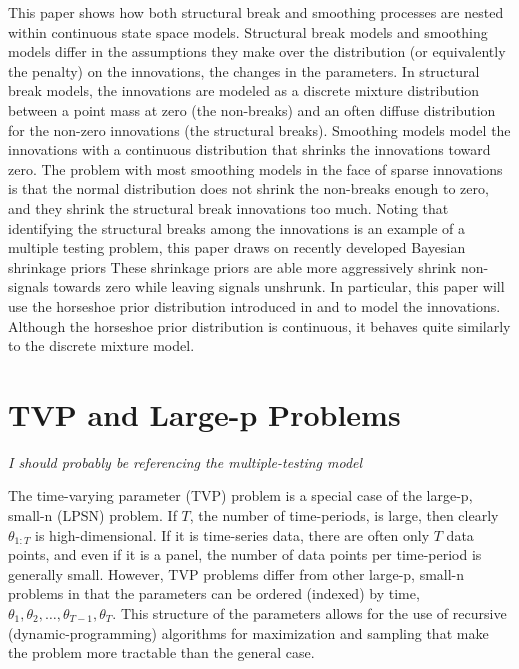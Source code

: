 \documentclass{article}
\begin{document}
This paper shows how both structural break and smoothing processes are nested within continuous state space models.
Structural break models and smoothing models differ in the assumptions they make over the distribution (or equivalently the penalty) on the innovations, the changes in the parameters.
In structural break models, the innovations are modeled as a discrete mixture distribution between a point mass at zero (the non-breaks) and an often diffuse distribution for the non-zero innovations (the structural breaks).
Smoothing models model the innovations with a continuous distribution that shrinks the innovations toward zero.
The problem with most smoothing models in the face of sparse innovations is that the normal distribution does not shrink the non-breaks enough to zero, and they shrink the structural break innovations too much.
Noting that identifying the structural breaks among the innovations is an example of a multiple testing problem, this paper draws on recently developed Bayesian shrinkage priors
These shrinkage priors are able more aggressively shrink non-signals towards zero while leaving signals unshrunk.
In particular, this paper will use the horseshoe prior distribution introduced in \textcite{CarvalhoPolsonScott2010} and \textcite{CarvalhoPolsonScott2009} to model the innovations.
Although the horseshoe prior distribution is continuous, it behaves quite similarly to the discrete mixture model.

\section{TVP and Large-p Problems}
\label{sec:tvp-large-p}

\textit{I should probably be referencing the multiple-testing model}

The time-varying parameter (TVP) problem is a special case of the large-p, small-n (LPSN) problem.
If $T$, the number of time-periods, is large, then clearly $\theta_{1:T}$ is high-dimensional.
If it is time-series data, there are often only $T$ data points, and even if it is a panel, the number of data points per time-period is generally small. 
However, TVP problems differ from other large-p, small-n problems in that the parameters can be ordered (indexed) by time, $\theta_{1}, \theta_{2}, \dots, \theta_{T-1}, \theta_{T}$.
This structure of the parameters allows for the use of recursive (dynamic-programming) algorithms for maximization and sampling that make the problem more tractable than the general case.
\end{document}

